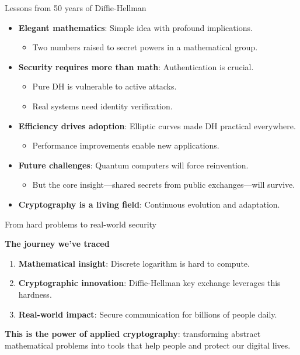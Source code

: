 \documentclass[aspectratio=169, lualatex, handout]{beamer}
\begin{document}
\begin{frame}{Lessons from 50 years of Diffie-Hellman}
	\begin{itemize}[<+->]
		\item \textbf{Elegant mathematics}: Simple idea with profound implications.
		      \begin{itemize}
			      \item Two numbers raised to secret powers in a mathematical group.
		      \end{itemize}
		\item \textbf{Security requires more than math}: Authentication is crucial.
		      \begin{itemize}
			      \item Pure DH is vulnerable to active attacks.
			      \item Real systems need identity verification.
		      \end{itemize}
		\item \textbf{Efficiency drives adoption}: Elliptic curves made DH practical everywhere.
		      \begin{itemize}
			      \item Performance improvements enable new applications.
		      \end{itemize}
		\item \textbf{Future challenges}: Quantum computers will force reinvention.
		      \begin{itemize}
			      \item But the core insight—shared secrets from public exchanges—will survive.
		      \end{itemize}
		\item \textbf{Cryptography is a living field}: Continuous evolution and adaptation.
	\end{itemize}
\end{frame}

\begin{frame}{From hard problems to real-world security}
	\begin{center}
		\Large\textbf{The journey we've traced}
	\end{center}
	\vspace{0.5cm}
	\begin{enumerate}[<+->]
		\item \textbf{Mathematical insight}: Discrete logarithm is hard to compute.
		\item \textbf{Cryptographic innovation}: Diffie-Hellman key exchange leverages this hardness.
		\item \textbf{Real-world impact}: Secure communication for billions of people daily.
	\end{enumerate}
	\vspace{1cm}
	\textbf{This is the power of applied cryptography}: transforming abstract mathematical problems into tools that help people and protect our digital lives.
\end{frame}

\begin{frame}[plain]
	\titlepage
\end{frame}
\end{document}

